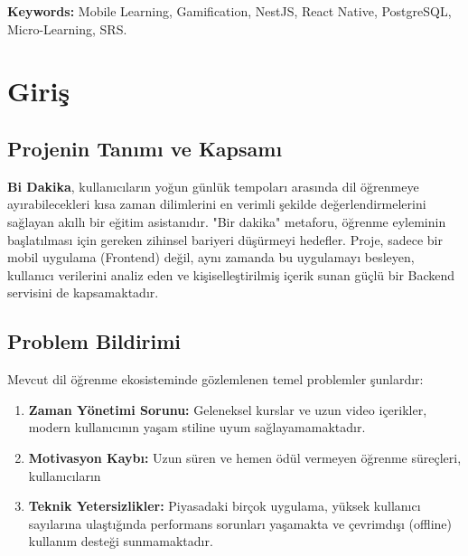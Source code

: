 \documentclass[12pt,a4paper]{report}
\begin{document}
\textbf{Keywords:} Mobile Learning, Gamification, NestJS, React Native, PostgreSQL, Micro-Learning, SRS.

\newpage

\tableofcontents
\listoftables
\listoffigures
\newpage

\chapter{Giriş}

\section{Projenin Tanımı ve Kapsamı}
\textbf{Bi Dakika}, kullanıcıların yoğun günlük tempoları arasında dil öğrenmeye ayırabilecekleri kısa zaman dilimlerini en verimli şekilde değerlendirmelerini sağlayan akıllı bir eğitim asistanıdır. "Bir dakika" metaforu, öğrenme eyleminin başlatılması için gereken zihinsel bariyeri düşürmeyi hedefler. Proje, sadece bir mobil uygulama (Frontend) değil, aynı zamanda bu uygulamayı besleyen, kullanıcı verilerini analiz eden ve kişiselleştirilmiş içerik sunan güçlü bir Backend servisini de kapsamaktadır.

\section{Problem Bildirimi}
Mevcut dil öğrenme ekosisteminde gözlemlenen temel problemler şunlardır:
\begin{enumerate}
    \item \textbf{Zaman Yönetimi Sorunu:} Geleneksel kurslar ve uzun video içerikler, modern kullanıcının yaşam stiline uyum sağlayamamaktadır.
    \item \textbf{Motivasyon Kaybı:} Uzun süren ve hemen ödül vermeyen öğrenme süreçleri, kullanıcıların %
    \item \textbf{Teknik Yetersizlikler:} Piyasadaki birçok uygulama, yüksek kullanıcı sayılarına ulaştığında performans sorunları yaşamakta ve çevrimdışı (offline) kullanım desteği sunmamaktadır.
\end{enumerate}
\end{document}
